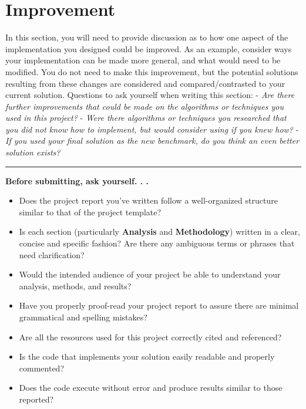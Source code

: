 \documentclass[]{report}
\begin{document}
\chapter{Improvement}\label{improvement}

In this section, you will need to provide discussion as to how one
aspect of the implementation you designed could be improved. As an
example, consider ways your implementation can be made more general, and
what would need to be modified. You do not need to make this
improvement, but the potential solutions resulting from these changes
are considered and compared/contrasted to your current solution.
Questions to ask yourself when writing this section: - \emph{Are there
further improvements that could be made on the algorithms or techniques
you used in this project?} - \emph{Were there algorithms or techniques
you researched that you did not know how to implement, but would
consider using if you knew how?} - \emph{If you used your final solution
as the new benchmark, do you think an even better solution exists?}

\begin{center}\rule{0.5\linewidth}{\linethickness}\end{center}

\textbf{Before submitting, ask yourself. . .}

\begin{itemize}
\tightlist
\item
  Does the project report you've written follow a well-organized
  structure similar to that of the project template?
\item
  Is each section (particularly \textbf{Analysis} and
  \textbf{Methodology}) written in a clear, concise and specific
  fashion? Are there any ambiguous terms or phrases that need
  clarification?
\item
  Would the intended audience of your project be able to understand your
  analysis, methods, and results?
\item
  Have you properly proof-read your project report to assure there are
  minimal grammatical and spelling mistakes?
\item
  Are all the resources used for this project correctly cited and
  referenced?
\item
  Is the code that implements your solution easily readable and properly
  commented?
\item
  Does the code execute without error and produce results similar to
  those reported?
\end{itemize}
\end{document}

